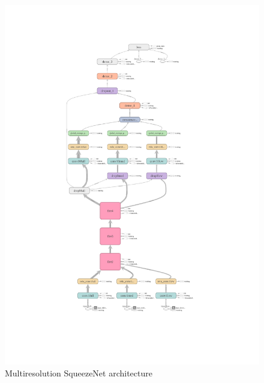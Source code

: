 \documentclass{article}
\begin{document}
\begin{figure}[h]
  \vspace*{-40mm}
  \includegraphics[scale=0.8]{actualsqueezemodelhires.pdf}
  \vspace*{-35mm}
  \caption{Multiresolution SqueezeNet architecture}
  \label{fig:squeezenetgraph}
\end{figure}
\end{document}
